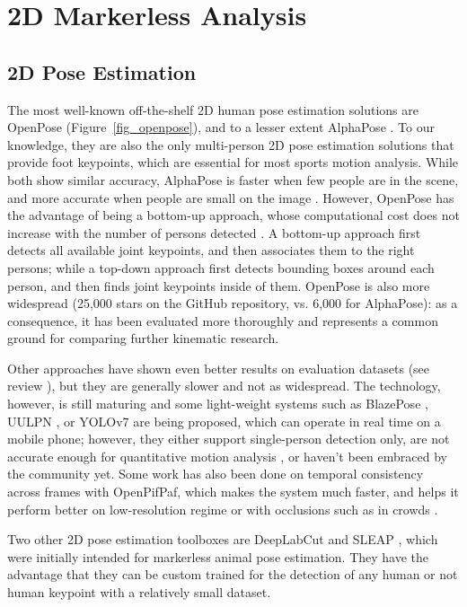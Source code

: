 \FloatBarrier
\section{2D Markerless Analysis}
\subsection{2D Pose Estimation}

The most well-known off-the-shelf 2D human pose estimation solutions are OpenPose \cite{Cao2019} (Figure~\ref{fig_openpose}), and to a lesser extent AlphaPose \cite{Fang2017}. To our knowledge, they are also the only multi-person 2D pose estimation solutions that provide foot keypoints, which are essential for most sports motion analysis. While both show similar accuracy, AlphaPose is faster when few people are in the scene, and more accurate when people are small on the image \cite{Hidalgo2019}. However, OpenPose has the advantage of being a bottom-up approach, whose computational cost does not increase with the number of persons detected \cite{Cao2019}. A bottom-up approach first detects all available joint keypoints, and then associates them to the right persons; while a top-down approach first detects bounding boxes around each person, and then finds joint keypoints inside of them. OpenPose is also more widespread (25,000 stars on the GitHub repository, vs. 6,000 for AlphaPose): as a consequence, it has been evaluated more thoroughly and represents a common ground for comparing further kinematic research. 

Other approaches have shown even better results on evaluation datasets (see review \cite{Chen2020a}), but they are generally slower and not as widespread. The technology, however, is still maturing and some light-weight systems such as BlazePose \cite{Bazarevsky2020}, UULPN \cite{Wang2022a}, or YOLOv7 \cite{Wang2022b} are being proposed, which can operate in real time on a mobile phone; however, they either support single-person detection only, are not accurate enough for quantitative motion analysis \cite{Mroz2021}, or haven't been embraced by the community yet. Some work has also been done on temporal consistency across frames with OpenPifPaf, which makes the system much faster, and helps it perform better on low-resolution regime or with occlusions such as in crowds \cite{Kreiss2021}.

Two other 2D pose estimation toolboxes are DeepLabCut \cite{Mathis2018,Lauer2022} and SLEAP \cite{Pereira2022}, which were initially intended for markerless animal pose estimation. They have the advantage that they can be custom trained for the detection of any human or not human keypoint with a relatively small dataset. 

